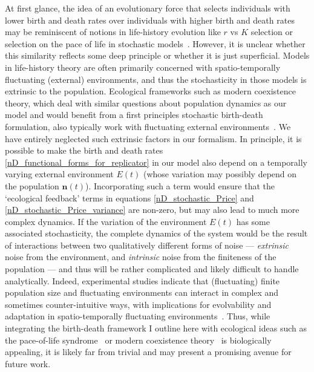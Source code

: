 At first glance, the idea of an evolutionary force that selects individuals with lower birth and death rates over individuals with higher birth and death rates may be reminiscent of notions in life-history evolution like $r$ vs $K$ selection or selection on the pace of life in stochastic models~\citep{stearns_evolution_1977}. However, it is unclear whether this similarity reflects some deep principle or whether it is just superficial. Models in life-history theory are often primarily concerned with spatio-temporally fluctuating (external) environments, and thus the stochasticity in those models is extrinsic to the population. Ecological frameworks such as modern coexistence theory, which deal with similar questions about population dynamics as our model and would benefit from a first principles stochastic birth-death formulation, also typically work with fluctuating external environments~\citep{chesson_stabilizing_1982,chesson_multispecies_1994}. We have entirely neglected such extrinsic factors in our formalism. In principle, it is possible to make the birth and death rates \eqref{nD_functional_forms_for_replicator} in our model also depend on a temporally varying external environment $E(t)$ (whose variation may possibly depend on the population $\mathbf{n}(t)$). Incorporating such a term would ensure that the `ecological feedback' terms in equations \eqref{nD_stochastic_Price} and \eqref{nD_stochastic_Price_variance} are non-zero, but may also lead to much more complex dynamics. If the variation of the environment $E(t)$ has some associated stochasticity, the complete dynamics of the system would be the result of interactions between two qualitatively different forms of noise --- \emph{extrinsic} noise from the environment, and \emph{intrinsic} noise from the finiteness of the population --- and thus will be rather complicated and likely difficult to handle analytically. Indeed, experimental studies indicate that (fluctuating) finite population size and fluctuating environments can interact in complex and sometimes counter-intuitive ways, with implications for evolvability and adaptation in spatio-temporally fluctuating environments~\citep{chavhan_larger_2020, chavhan_interplay_2021}. Thus, while integrating the birth-death framework I outline here with ecological ideas such as the pace-of-life syndrome~\citep{mathot_models_2018, wright_life-history_2019} or modern coexistence theory~\citep{chesson_multispecies_1994, johnson_resolving_2022} is biologically appealing, it is likely far from trivial and may present a promising avenue for future work.

